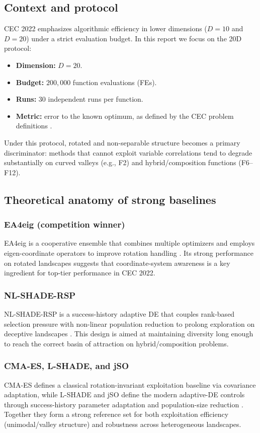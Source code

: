 \documentclass[conference]{IEEEtran}
\begin{document}
\subsection{Context and protocol}
CEC 2022 emphasizes algorithmic efficiency in lower dimensions ($D=10$ and $D=20$) under a strict evaluation budget. In this report we focus on the 20D protocol:
\begin{itemize}
    \item \textbf{Dimension:} $D=20$.
    \item \textbf{Budget:} $200{,}000$ function evaluations (FEs).
    \item \textbf{Runs:} $30$ independent runs per function.
    \item \textbf{Metric:} error to the known optimum, as defined by the CEC problem definitions \cite{Suganthan2022}.
\end{itemize}
Under this protocol, rotated and non-separable structure becomes a primary discriminator: methods that cannot exploit variable correlations tend to degrade substantially on curved valleys (e.g., F2) and hybrid/composition functions (F6--F12).

\subsection{Theoretical anatomy of strong baselines}
\subsubsection{EA4eig (competition winner)}
EA4eig is a cooperative ensemble that combines multiple optimizers and employs eigen-coordinate operators to improve rotation handling \cite{Biedrzycki2022,BiedrzyckiAnalysis}. Its strong performance on rotated landscapes suggests that coordinate-system awareness is a key ingredient for top-tier performance in CEC 2022.

\subsubsection{NL-SHADE-RSP}
NL-SHADE-RSP is a success-history adaptive DE that couples rank-based selection pressure with non-linear population reduction to prolong exploration on deceptive landscapes \cite{Stanovov2022}. This design is aimed at maintaining diversity long enough to reach the correct basin of attraction on hybrid/composition problems.

\subsubsection{CMA-ES, L-SHADE, and jSO}
CMA-ES defines a classical rotation-invariant exploitation baseline via covariance adaptation, while L-SHADE and jSO define the modern adaptive-DE controls through success-history parameter adaptation and population-size reduction \cite{Comparative2022}. Together they form a strong reference set for both exploitation efficiency (unimodal/valley structure) and robustness across heterogeneous landscapes.
\end{document}
